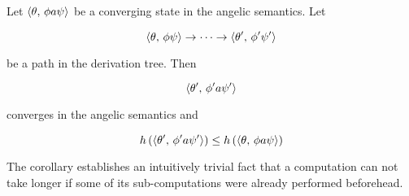 \begin{corollary}
  \label{cor:corollary}
  Let $\langle \theta,\,\phi a \psi \rangle$ be a converging state in the angelic semantics. Let

  \[
  \langle \theta,\,\phi\psi \rangle\to\dots\to\langle \theta^\prime,\,\phi^\prime\psi^\prime \rangle
  \]

  be a path in the derivation tree. Then

  \[
  \langle \theta^\prime,\,\phi^\prime a \psi^\prime \rangle
  \]

  converges in the angelic semantics and

  \[
  h\,(\langle \theta^\prime,\,\phi^\prime a \psi^\prime \rangle)\le h\,(\langle \theta,\,\phi a \psi \rangle)
  \]  
\end{corollary}

The corollary establishes an intuitively trivial fact that a computation can not take longer if some of its sub-computations were
already performed beforehead.


